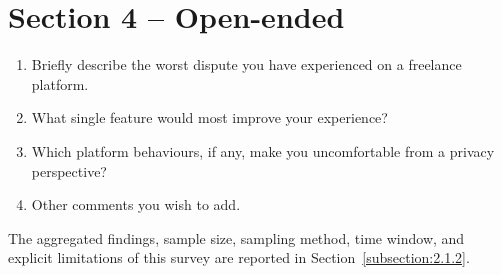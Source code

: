 \section*{Section 4 -- Open-ended}
\begin{enumerate}[noitemsep,label=Q\arabic*., start=13]
    \item Briefly describe the worst dispute you have experienced on a freelance platform.
    \item What single feature would most improve your experience?
    \item Which platform behaviours, if any, make you uncomfortable from a privacy perspective?
    \item Other comments you wish to add.
\end{enumerate}

\noindent The aggregated findings, sample size, sampling method, time window, and explicit limitations of this survey are reported in Section~\ref{subsection:2.1.2}.

